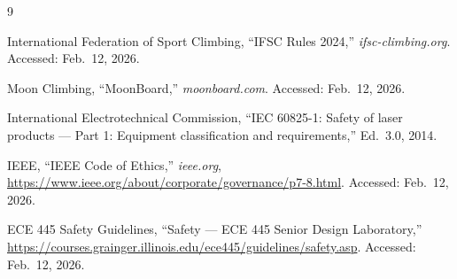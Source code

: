 \documentclass[12pt]{extarticle}
\begin{document}
\newpage
\begin{thebibliography}{9}

International Federation of Sport Climbing, ``IFSC Rules 2024,'' \textit{ifsc-climbing.org}.
Accessed: Feb.\ 12, 2026.

Moon Climbing, ``MoonBoard,'' \textit{moonboard.com}. Accessed: Feb.\ 12, 2026.

International Electrotechnical Commission, ``IEC 60825-1: Safety of laser products --- Part 1:
Equipment classification and requirements,'' Ed.\ 3.0, 2014.

IEEE, ``IEEE Code of Ethics,'' \textit{ieee.org},
\url{https://www.ieee.org/about/corporate/governance/p7-8.html}. Accessed: Feb.\ 12, 2026.

ECE 445 Safety Guidelines, ``Safety --- ECE 445 Senior Design Laboratory,''
\url{https://courses.grainger.illinois.edu/ece445/guidelines/safety.asp}. Accessed:
Feb.\ 12, 2026.


\end{thebibliography}
\end{document}
